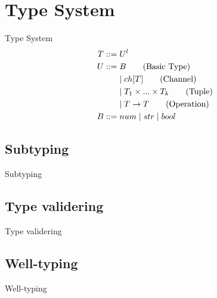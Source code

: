 \section{Type System}
\begin{frame}{Type System}
    \begin{align*}
        T::=&\;U^l\\    	
        U::=&\;B \tag{Basic Type}\\
        &\mid ch[T] \tag{Channel}\\
        &\mid T_1 \times...\times T_k \tag{Tuple}\\
        &\mid T\rightarrow T \tag{Operation}\\
        B::=&\;num 
        \mid str
        \mid bool\\
    \end{align*}
\end{frame}

\subsection{Subtyping}
\begin{frame}{Subtyping}

\end{frame}

\subsection{Type validering}
\begin{frame}{Type validering}

\end{frame}

\subsection{Well-typing}
\begin{frame}{Well-typing}

\end{frame}



